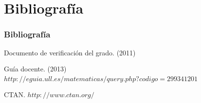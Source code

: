 \documentclass{beamer}
\begin{document}
\section{Bibliografía}

\begin{frame}
  \frametitle{Bibliografía}

  \begin{thebibliography}{10}
    \beamertemplatebookbibitems
    Documento de verificación del grado.
    (2011)

    \beamertemplatebookbibitems
    Guía docente.
    (2013)
    {\small $http://eguia.ull.es/matematicas/query.php?codigo=299341201$}

    \beamertemplatebookbibitems
    CTAN. {\small $http://www.ctan.org/$}


  \end{thebibliography}
\end{frame}

\end{document}
